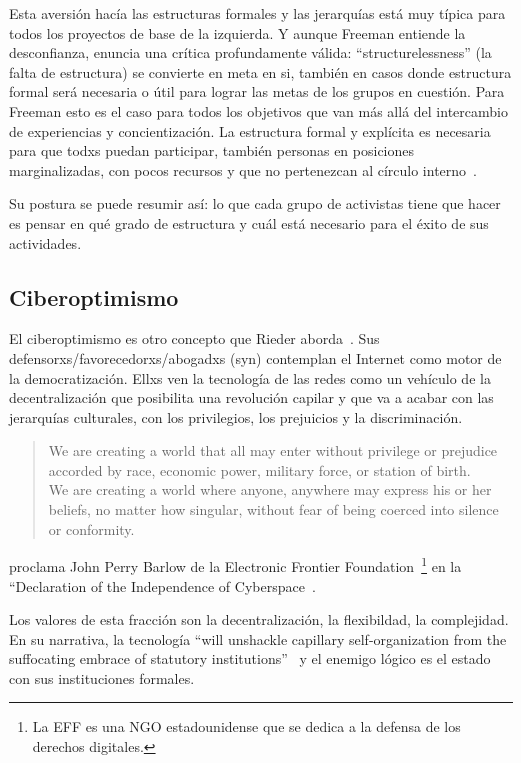 Esta aversión hacía las estructuras formales y las jerarquías está muy típica para todos los proyectos de base de la izquierda.
Y aunque Freeman entiende la desconfianza, enuncia una crítica profundamente válida:
``structurelessness'' (la falta de estructura) se convierte en meta en si, también en casos donde estructura formal será necesaria o útil para lograr las metas de los grupos en cuestión.
Para Freeman esto es el caso para todos los objetivos que van más allá del intercambio de experiencias y concientización.
La estructura formal y explícita es necesaria para que todxs puedan participar, también personas en posiciones marginalizadas, con pocos recursos y que no pertenezcan al círculo interno~\autocite{Freeman1970}.

Su postura se puede resumir así: lo que cada grupo de activistas tiene que hacer es pensar en qué grado de estructura y cuál está necesario para el éxito de sus actividades.

\subsection{Ciberoptimismo}

El ciberoptimismo es otro concepto que Rieder aborda~\autocite{Rieder2012}.
Sus defensorxs/favorecedorxs/abogadxs (syn) contemplan el Internet como motor de la democratización.
Ellxs ven la tecnología de las redes como un vehículo de la decentralización que posibilita una revolución capilar y que va a acabar con las jerarquías culturales, con los privilegios, los prejuicios y la discriminación.

\begin{quotation}
We are creating a world that all may enter without privilege or prejudice accorded by race, economic power, military force, or station of birth.\\
We are creating a world where anyone, anywhere may express his or her beliefs, no matter how singular, without fear of being coerced into silence or conformity.
\end{quotation}
proclama John Perry Barlow de la Electronic Frontier Foundation~\footnote{La EFF es una NGO estadounidense que se dedica a la defensa de los derechos digitales.} en la ``Declaration of the Independence of Cyberspace~\autocite{Barlow1996}.

Los valores de esta fracción  son la decentralización, la flexibildad, la complejidad.
En su narrativa, la tecnología ``will unshackle capillary self-organization from the suffocating embrace of statutory institutions''~\autocite{Rieder2012} y el enemigo lógico es el estado con sus instituciones formales.

